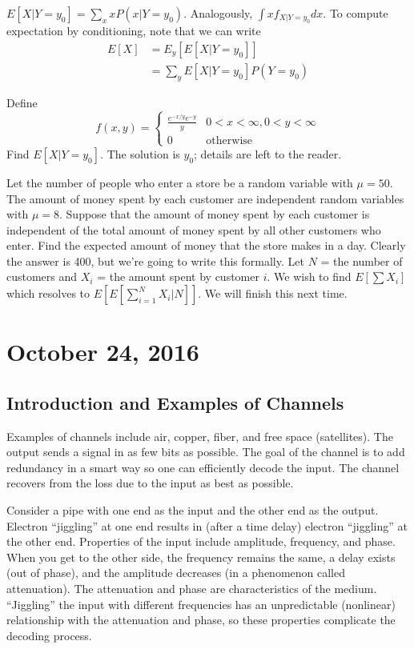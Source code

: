 \documentclass[11pt]{article}
\theoremstyle{definition}
\begin{document}
$E[X | Y = y_0]  = \sum_x x P(x | Y = y_0)$. Analogously, $\int x f_{X | Y = y_0} dx$. To compute expectation by conditioning, note that we can write \begin{align*} E[X] &= E_y[E[X | Y = y_0]] \\ &= \sum_y E[X | Y = y_0] P(Y = y_0) \end{align*}

\example Define \begin{equation*}
f(x,y) = \begin{cases}
\frac{e^{-x/y} e^{-y}}{y} & 0 < x < \infty, 0 < y < \infty \\
0 & \text{otherwise}
\end{cases}
\end{equation*}
Find $E[X | Y = y_0]$. The solution is $y_0$; details are left to the reader.  

\example Let the number of people who enter a store be a random variable with $\mu = 50$. The amount of money spent by each customer are independent random variables with $\mu = 8$. Suppose that the amount of money spent by each customer is independent of the total amount of money spent by all other customers who enter. Find the expected amount of money that the store makes in a day. 
Clearly the answer is 400, but we're going to write this formally. Let $N$ = the number of customers and $X_i$ = the amount spent by customer $i$. We wish to find $E[\sum X_i]$ which resolves to $E[E[\sum_{i = 1}^N X_i | N]]$. We will finish this next time. 

\section{October 24, 2016}

\subsection{Introduction and Examples of Channels}

Examples of channels include air, copper, fiber, and free space (satellites). The output sends a signal in as few bits as possible. The goal of the channel is to add redundancy in a smart way so one can efficiently decode the input. The channel recovers from the loss due to the input as best as possible. 

Consider a pipe with one end as the input and the other end as the output. Electron ``jiggling'' at one end results in (after a time delay) electron ``jiggling'' at the other end. Properties of the input include amplitude, frequency, and phase. When you get to the other side, the frequency remains the same, a delay exists (out of phase), and the amplitude decreases (in a phenomenon called attenuation). The attenuation and phase are characteristics of the medium. ``Jiggling'' the input with different frequencies has an unpredictable (nonlinear) relationship with the attenuation and phase, so these properties complicate the decoding process. 
\end{document}
